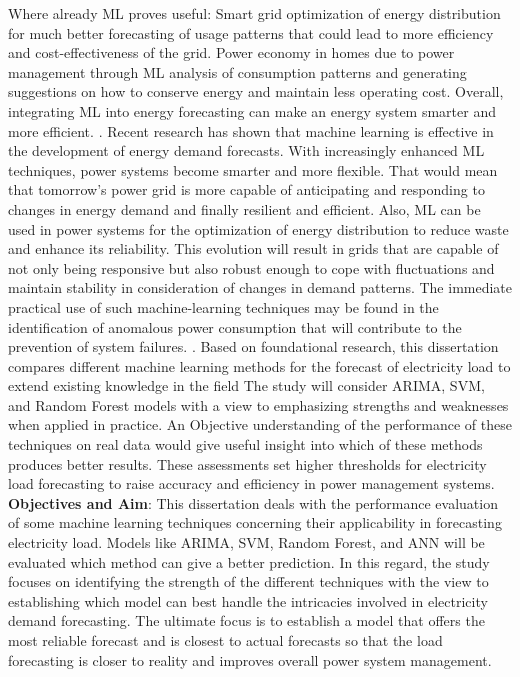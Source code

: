 \documentclass[12pt, a4paper,twoside]{report}
\theoremstyle{plain} %
\theoremstyle{definition} %
\theoremstyle{remark} %
\numberwithin{equation}{chapter}
\begin{document}
Where already ML proves useful: Smart grid optimization of energy distribution for much better forecasting of usage patterns that could lead to more efficiency and cost-effectiveness of the grid. Power economy in homes due to power management through ML analysis of consumption patterns and generating suggestions on how to conserve energy and maintain less operating cost. Overall, integrating ML into energy forecasting can make an energy system smarter and more efficient. \cite{shi2017deep}.
\newline
\newline
Recent research has shown that machine learning is effective in the development of energy demand forecasts. With increasingly enhanced ML techniques, power systems become smarter and more flexible. That would mean that tomorrow's power grid is more capable of anticipating and responding to changes in energy demand and finally resilient and efficient. Also, ML can be used in power systems for the optimization of energy distribution to reduce waste and enhance its reliability. This evolution will result in grids that are capable of not only being responsive but also robust enough to cope with fluctuations and maintain stability in consideration of changes in demand patterns\cite{mandal2006neural,hippert2001neural}. The immediate practical use of such machine-learning techniques may be found in the identification of anomalous power consumption that will contribute to the prevention of system failures.
\cite{chou2014real}.
\newline
\newline
Based on foundational research, this dissertation compares different machine learning methods for the forecast of electricity load to extend existing knowledge in the field\cite{smola2004tutorial,hyndman2018forecasting,liaw2002classification} The study will consider ARIMA, SVM, and Random Forest models with a view to emphasizing strengths and weaknesses when applied in practice. An Objective understanding of the performance of these techniques on real data would give useful insight into which of these methods produces better results. These assessments set higher thresholds for electricity load forecasting to raise accuracy and efficiency in power management systems.
\newline
\newline
\newline
\textbf{Objectives and Aim}:
\newline
This dissertation deals with the performance evaluation of some machine learning techniques concerning their applicability in forecasting electricity load. Models like ARIMA, SVM, Random Forest, and ANN will be evaluated which method can give a better prediction. In this regard, the study focuses on identifying the strength of the different techniques with the view to establishing which model can best handle the intricacies involved in electricity demand forecasting. The ultimate focus is to establish a model that offers the most reliable forecast and is closest to actual forecasts so that the load forecasting is closer to reality and improves overall power system management.
\end{document}
